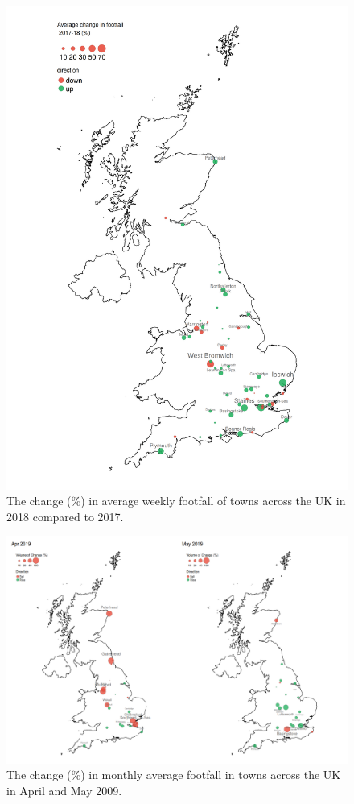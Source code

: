 \cleartoleftpage
\begin{figure}
  \forceversofloat
  \includegraphics[trim={0 0 0 0},clip]{images/applications-cities-rank.png}
  \caption{The change (\%) in average weekly footfall of towns across the UK in 2018 compared to 2017.}
  \label{figure:applications:cities:change}
\end{figure}

\begin{figure}
  \forcerectofloat
  \includegraphics[trim={0 12 0 0},clip]{images/applications-city-indices.png}
  \caption{The change (\%) in monthly average footfall in towns across the UK in April and May 2009.}
  \label{figure:applications:cities:month}
\end{figure}

